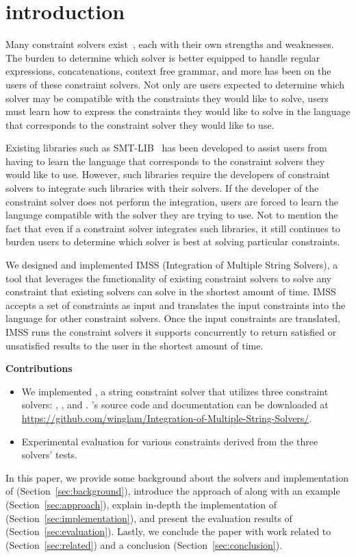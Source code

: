 \section{introduction}
\label{sec:introduction}
Many constraint solvers exist~\cite{solvers}, each with their own strengths and weaknesses. The burden to determine which solver is better equipped to handle regular expressions, concatenations, context free grammar, and more has been on the users of these constraint solvers. Not only are users expected to determine which solver may be compatible with the constraints they would like to solve, users must learn how to express the constraints they would like to solve in the language that corresponds to the constraint solver they would like to use.

Existing libraries such as SMT-LIB~\cite{smtlib2015} has been developed to assist users from having to learn the language that corresponds to the constraint solvers they would like to use. However, such libraries require the developers of constraint solvers to integrate such libraries with their solvers. If the developer of the constraint solver does not perform the integration, users are forced to learn the language compatible with the solver they are trying to use. Not to mention the fact that even if a constraint solver integrates such libraries, it still continues to burden users to determine which solver is best at solving particular constraints.

We designed and implemented IMSS (Integration of Multiple String Solvers), a tool that leverages the functionality of existing constraint solvers to solve any constraint that existing solvers can solve in the shortest amount of time. IMSS accepts a set of constraints as input and translates the input constraints into the language for other constraint solvers. Once the input constraints are translated, IMSS runs the constraint solvers it supports concurrently to return satisfied or unsatisfied results to the user in the shortest amount of time.

\textbf{Contributions}
\begin{itemize}
    \item We implemented \imss, a string constraint solver that utilizes three constraint solvers:
    \hampi, \dprle, and \zstr. \imss's source code and documentation can be downloaded at
    \url{https://github.com/winglam/Integration-of-Multiple-String-Solvers/}.
    \item Experimental evaluation for various constraints derived from the three solvers' tests.
\end{itemize}

In this paper, we provide some background about the solvers and implementation of \imss (Section~\ref{sec:background}), introduce the approach of \imss along with
an example (Section~\ref{sec:approach}), explain in-depth the
implementation of \imss (Section~\ref{sec:implementation}), and present the evaluation
results of \imss (Section~\ref{sec:evaluation}). Lastly, we conclude the paper with work related to \imss
(Section~\ref{sec:related}) and a conclusion (Section~\ref{sec:conclusion}).
